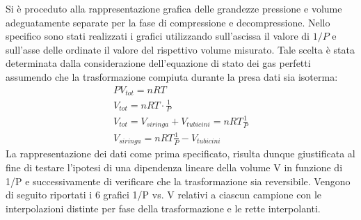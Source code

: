 \documentclass[a4paper,11pt,oneside]{article}
\begin{document}

Si è proceduto alla rappresentazione grafica delle grandezze pressione e volume adeguatamente separate per la fase di compressione e decompressione. Nello specifico sono stati realizzati i grafici utilizzando sull'ascissa il valore di $1/P$ e sull'asse delle ordinate il valore del rispettivo volume misurato. Tale scelta è stata determinata dalla considerazione dell'equazione di stato dei gas perfetti assumendo che la trasformazione compiuta durante la presa dati sia isoterma:
\begin{gather*}
    PV_{tot} = n R T \\
    V_{tot}= n R T \cdot \frac{1}{P}\\
    V_{tot}=V_{siringa}+V_{tubicini}=n R T \frac{1}{P}\\
    V_{siringa}=n R T \frac{1}{P} - V_{tubicini}
\end{gather*}
La rappresentazione dei dati come prima specificato, risulta dunque giustificata al fine di testare l'ipotesi di una dipendenza lineare della volume V in funzione di 1/P e successivamente di verificare  che la trasformazione sia reversibile.
Vengono di seguito riportati i 6 grafici 1/P vs. V relativi a ciascun campione con le interpolazioni distinte per fase della trasformazione e le rette interpolanti.

\begin{figure}
    \centering
    \newline
    \newline
    \label{fig:my_label}
\end{figure}
\end{document}
